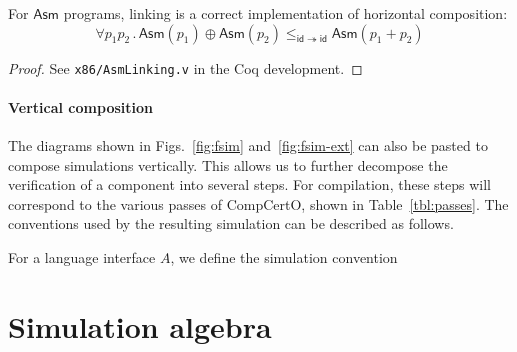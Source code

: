 \documentclass[acmsmall,authordraft]{acmart}
\newcommand{\kw}[1]{\ensuremath{ \mathsf{#1} }}
\begin{document}
\begin{theorem} \label{thm:asmlinking} %
For \kw{Asm} programs,
linking is a correct implementation of
horizontal composition:
\[
    \forall p_1 p_2 \,.\,
      \kw{Asm}(p_1) \oplus \kw{Asm}(p_2)
      \le_{\kw{id} \twoheadrightarrow \kw{id}}
      \kw{Asm}(p_1 + p_2)
\]
\begin{proof}
See \texttt{x86/AsmLinking.v} in the Coq development.
\end{proof}
\end{theorem}


\paragraph{Vertical composition} %

The diagrams shown in Figs.~\ref{fig:fsim} and~\ref{fig:fsim-ext}
can also be pasted to compose simulations vertically.
This allows us to further decompose the verification of a component
into several steps.
For compilation,
these steps will correspond to the various passes of CompCertO,
shown in Table~\ref{tbl:passes}.
The conventions used by the resulting simulation
can be described as follows.

\begin{definition}
For a language interface $A$,
we define the simulation convention 
\end{definition}



%
%
%


\section{Simulation algebra} \label{sec:simalg} %
\end{document}
